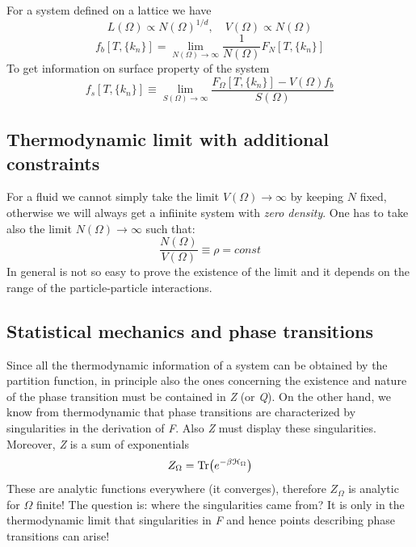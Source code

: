 \documentclass[../main/main.tex]{subfiles}
\begin{document}
For a system defined on a lattice we have
\begin{equation*}
  L (\Omega ) \propto N (\Omega )^{1/d}, \quad V (\Omega ) \propto N (\Omega )
\end{equation*}
\begin{equation}
  f_b [T,\{ k_n \}  ] = \lim_{N (\Omega) \rightarrow \infty } \frac{1}{N (\Omega )} F_N [T,\{ k_n \}  ]
\end{equation}
To get information on surface property of the system
\begin{equation}
  f_s [T,\{ k_n \}  ] \equiv \lim_{S (\Omega ) \rightarrow \infty } \frac{F_ \Omega [T,\{ k_n \}  ]  - V (\Omega ) f_b}{S (\Omega )}
\end{equation}

\subsection{Thermodynamic limit with additional constraints}
For a fluid we cannot simply take the limit \( V (\Omega ) \rightarrow \infty  \) by keeping \( N \) fixed, otherwise we will always get a infiinite system with \emph{zero density}. One has to take also the limit \( N(\Omega ) \rightarrow \infty  \) such that:
\begin{equation*}
  \frac{N (\Omega )}{V (\Omega )} \equiv \rho = const
\end{equation*}
In general is not so easy to prove the existence of the limit and it depends on the range of the particle-particle interactions.
\subsection{Statistical mechanics and phase transitions}
Since all the thermodynamic information of a system can be obtained by the partition function, in principle also the ones concerning the existence and nature of the phase transition must be contained in \emph{Z} (or \emph{Q}). On the other hand, we know from thermodynamic that phase transitions are characterized by singularities in the derivation of \emph{F}. Also \emph{Z} must display these singularities.
Moreover, \emph{Z} is a sum of exponentials
\begin{equation}
  Z_ \Omega = \Tr(e^{-\beta \mathcal{H}_ \Omega } )
\end{equation}
These are analytic functions everywhere (it converges), therefore \( Z_ \Omega  \) is analytic for \( \Omega  \) finite!
The question is: where the singularities came from?
It is only in the thermodynamic limit that singularities in \emph{F} and hence points describing phase transitions can arise!
\end{document}
